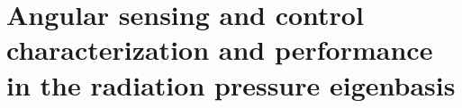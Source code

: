 \chapter{Angular sensing and control characterization and performance in the radiation pressure eigenbasis} 











